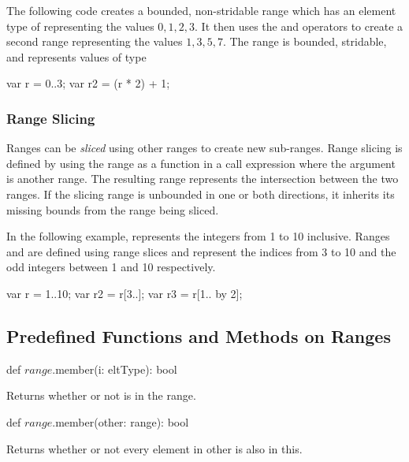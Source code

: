 \begin{example}
The following code creates a bounded, non-stridable range 
which has an element type of  representing the values ${0,
  1, 2, 3}$.  It then uses the \chpl{*} and \chpl{+} operators to
create a second range  representing the values ${1, 3, 5,
  7}$.  The  range is bounded, stridable, and represents
values of type 
\begin{chapel}
var r = 0..3;
var r2 = (r * 2) + 1;
\end{chapel}
\end{example}


\subsubsection{Range Slicing}
\label{Range_Slicing}

Ranges can be \emph{sliced} using other ranges to create new
sub-ranges.  Range slicing is defined by using the range as a function
in a call expression where the argument is another range.  The
resulting range represents the intersection between the two ranges.
If the slicing range is unbounded in one or both directions, it
inherits its missing bounds from the range being sliced.

\begin{example}
In the following example,  represents the integers from 1 to
10 inclusive.  Ranges  and  are defined using range
slices and represent the indices from 3 to 10 and the odd integers
between 1 and 10 respectively.
\begin{chapel}
var r = 1..10;
var r2 = r[3..];
var r3 = r[1.. by 2];
\end{chapel}
\end{example}

\subsection{Predefined Functions and Methods on Ranges}

\begin{protohead}
def $range$.member(i: eltType): bool
\end{protohead}
\begin{protobody}
Returns whether or not  is in the range.
\end{protobody}

\begin{protohead}
def $range$.member(other: range): bool
\end{protohead}
\begin{protobody}
Returns whether or not every element in other is also in this.
\end{protobody}

